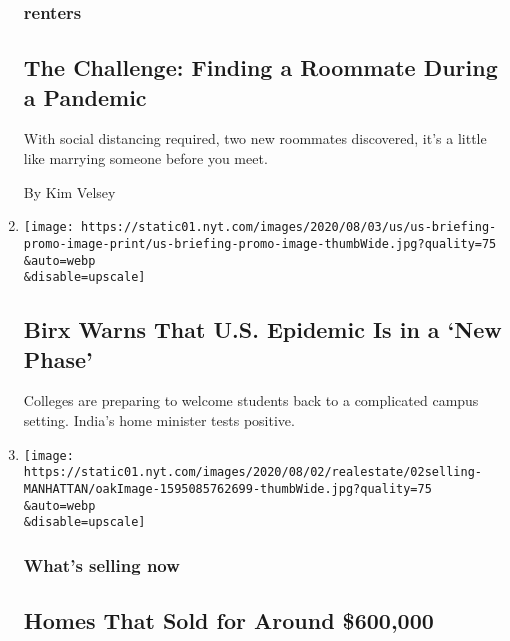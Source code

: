 \begin{enumerate}
  \hypertarget{renters}{%
  \subsubsection{renters}\label{renters}}

  \hypertarget{the-challenge-finding-a-roommate-during-a-pandemic}{%
  \subsection{The Challenge: Finding a Roommate During a
  Pandemic}\label{the-challenge-finding-a-roommate-during-a-pandemic}}

  With social distancing required, two new roommates discovered, it's a
  little like marrying someone before you meet.

  By Kim Velsey
\item
  \href{/2020/08/02/world/coronavirus-covid-19.html}{}

  \texttt{[image: https://static01.nyt.com/images/2020/08/03/us/us-briefing-promo-image-print/us-briefing-promo-image-thumbWide.jpg?quality=75\\\&auto=webp\\\&disable=upscale]}

  \hypertarget{birx-warns-that-us-epidemic-is-in-a-new-phase}{%
  \subsection{Birx Warns That U.S. Epidemic Is in a `New
  Phase'}\label{birx-warns-that-us-epidemic-is-in-a-new-phase}}

  Colleges are preparing to welcome students back to a complicated
  campus setting. India's home minister tests positive.
\item
  \href{/2020/08/02/realestate/homes-that-sold-for-around-600000.html}{}

  \texttt{[image: https://static01.nyt.com/images/2020/08/02/realestate/02selling-MANHATTAN/oakImage-1595085762699-thumbWide.jpg?quality=75\\\&auto=webp\\\&disable=upscale]}

  \hypertarget{whats-selling-now}{%
  \subsubsection{What's selling now}\label{whats-selling-now}}

  \hypertarget{homes-that-sold-for-around-600000}{%
  \subsection{Homes That Sold for Around
  \$600,000}\label{homes-that-sold-for-around-600000}}


\end{enumerate}
